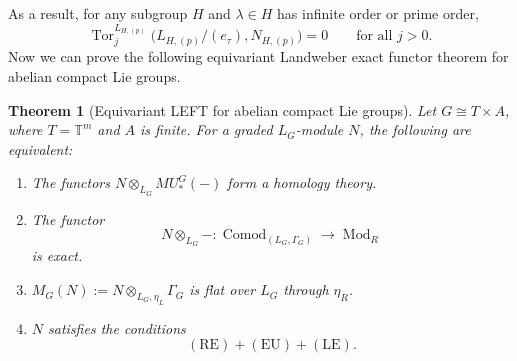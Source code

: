 \documentclass[11pt,reqno]{amsart}
\newtheorem{theorem}{Theorem}[section]
\newcommand{\bbT}{\mathbb T}
\newcommand{\tensor}{\otimes}
\begin{document}
As a result, for any subgroup $H$ and $\lambda\in H$ has infinite order or prime order, 
\[
  \operatorname{Tor}_j^{L_{H,(p)}}
  \bigl(L_{H,(p)}/(e_\tau),N_{H,(p)}\bigr)=0
  \qquad\text{for all }j>0.
\]
Now we can prove the following equivariant Landweber exact functor theorem for abelian compact Lie groups.
\begin{theorem}[Equivariant LEFT for abelian compact Lie groups]\label{thm:compact-LEFT}
Let $G\cong T\times A$, where $T=\bbT^m$ and $A$ is finite. For a graded $L_G$-module $N$, the following are equivalent:
\begin{enumerate}[label=\textup{(\roman*)},leftmargin=3em]
\item The functors $ N\tensor_{L_{G}} MU_*^G(-) $ form a homology theory.
\item The functor
\[
N\otimes_{L_G}- \colon \operatorname{Comod}_{(L_G,\Gamma_G)} \longrightarrow\operatorname{Mod}_R
\]
is exact.
\item $M_G(N):= N\otimes_{L_G,\eta_L}\Gamma_G$ is flat over $L_G$ through $\eta_R$.
\item $N$ satisfies the conditions $$(\mathrm{RE})+(\mathrm{EU})+ (\mathrm{LE}).$$
\end{enumerate}
\end{theorem}
\end{document}
